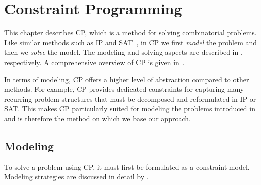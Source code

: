 %

\chapter{Constraint Programming}


This chapter describes \gls{CP}, which is a method for solving combinatorial
problems.
%
Like similar methods such as \gls{IP} and \gls{SAT}~\cite{BiereEtAl:2009}, in
\gls{CP} we first \emph{model} the problem and then we \emph{solve} the model.
%
The modeling and solving aspects are described in , respectively.
%
A comprehensive overview of \gls{CP} is given in~\cite{RossiEtAl:2006}.

In terms of modeling, \gls{CP} offers a higher level of abstraction compared to
other methods.
%
For example, \gls{CP} provides dedicated \glspl{constraint} for capturing many
recurring problem structures that must be decomposed and reformulated in
\gls{IP} or \gls{SAT}.
%
This makes \gls{CP} particularly suited for modeling the problems introduced in
 and is therefore the method on which we base our
approach.


\section{Modeling}

To solve a problem using \gls{CP}, it must first be formulated as a
\gls{constraint model}.
%
Modeling strategies are discussed in detail by \textcite{Smith:2006}.

